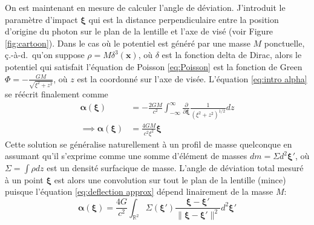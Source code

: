 On est maintenant en mesure de calculer l'angle de déviation. 
J'introduit le paramètre d'impact $\boldsymbol{\xi}$ qui est la distance perpendiculaire entre 
la position d'origine du photon sur le plan de la lentille  
et l'axe de visé (voir Figure \ref{fig:cartoon}).
Dans le cas où le potentiel est généré par une masse $M$ ponctuelle, ç.-à-d.\ qu'on 
suppose $\rho = M\delta^{3}(\mathbf{x})$, où $\delta $ est la fonction delta de Dirac, 
alors le potentiel qui satisfait l'équation de Poisson \eqref{eq:Poisson} est 
la fonction de Green 
$\displaystyle \Phi = -\frac{GM}{\sqrt{ \xi^{2} + z^{2}}}$, où $z$ est la coordonné 
sur l'axe de visée. L'équation \eqref{eq:intro alpha} se réécrit finalement comme 
\begin{align}
\nonumber
        \boldsymbol{ \alpha}(\boldsymbol{ \xi} ) &= -\frac{2GM}{c^{2}} \int_{-\infty }^{\infty }  \frac{\partial}{\partial \boldsymbol{\xi} }\frac{1}{(\xi^{2} + z^{2})^{1/2}}dz \\
\label{eq:deflection approx}
        \implies \boldsymbol{ \alpha}(\boldsymbol{ \xi})  &= \frac{4GM}{c^{2}  \xi^{2} } \boldsymbol{ \xi}
\end{align} 
Cette solution se généralise naturellement à un profil de masse quelconque en assumant 
qu'il s'exprime comme une somme d'élément de masses $dm = \Sigma d^{2}\boldsymbol{ \xi}'$, 
où $\Sigma = \int \rho dz$ est un densité surfacique de masse. 
L'angle de déviation total mesuré à un point $\boldsymbol{\xi} $ est alors une convolution 
sur tout le plan de la lentille (mince) puisque l'équation \eqref{eq:deflection approx} dépend 
linairement de la masse $M$:
\begin{equation}\label{eq:alpha physique}
        \boldsymbol{ \alpha} (\boldsymbol{ \xi} ) = \frac{4 G}{c^{2}} 
        \int_{\mathbb{R}^{2}} \Sigma (\boldsymbol{ \xi} ')
        \frac{\boldsymbol{ \xi}  - \boldsymbol{ \xi} '}{\lVert \boldsymbol{ \xi}  - \boldsymbol{ \xi} ' \rVert^{2}}d^{2}\boldsymbol{ \xi} '
\end{equation} 

